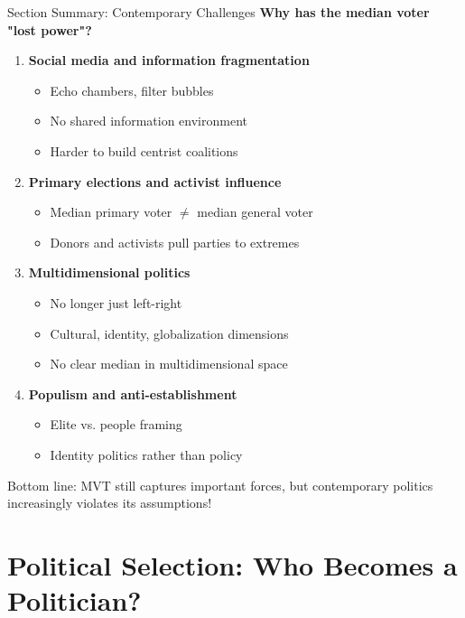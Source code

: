 \documentclass[10pt]{beamer}
\begin{document}
\begin{frame}{Section Summary: Contemporary Challenges}
\textbf{Why has the median voter "lost power"?}


\begin{enumerate}
\item \textbf{Social media and information fragmentation}
\begin{itemize}
\item Echo chambers, filter bubbles
\item No shared information environment
\item Harder to build centrist coalitions
\end{itemize}


\item \textbf{Primary elections and activist influence}
\begin{itemize}
\item Median primary voter $\neq$ median general voter
\item Donors and activists pull parties to extremes
\end{itemize}


\item \textbf{Multidimensional politics}
\begin{itemize}
\item No longer just left-right
\item Cultural, identity, globalization dimensions
\item No clear median in multidimensional space
\end{itemize}


\item \textbf{Populism and anti-establishment}
\begin{itemize}
\item Elite vs. people framing
\item Identity politics rather than policy
\end{itemize}
\end{enumerate}



\alert{Bottom line:} MVT still captures important forces, but contemporary politics increasingly violates its assumptions!
\end{frame}


\section{Political Selection: Who Becomes a Politician?}
\end{document}
